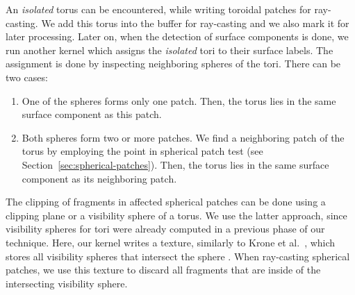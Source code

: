 An \textit{isolated} torus can be encountered, while writing toroidal patches for ray-casting.
We add this torus into the buffer for ray-casting and we also mark it for later processing.
Later on, when the detection of surface components is done, we run another kernel which assigns the \textit{isolated} tori to their surface labels.
The assignment is done by inspecting neighboring spheres of the tori.
There can be two cases:
\begin{enumerate}
  \item One of the spheres forms only one patch. Then, the torus lies in the same surface component as this patch.
	\item Both spheres form two or more patches. We find a neighboring patch of the torus by employing the point in spherical patch test (see Section~\ref{sec:spherical-patches}). Then, the torus lies in the same surface component as its neighboring patch.
\end{enumerate}

The clipping of fragments in affected spherical patches can be done using a clipping plane or a visibility sphere of a torus.
We use the latter approach, since visibility spheres for tori were already computed in a previous phase of our technique.
Here, our kernel writes a texture, similarly to Krone et al.~\cite{krone2011parallel}, which stores all visibility spheres that intersect the sphere .
When ray-casting spherical patches, we use this texture to discard all fragments that are inside of the intersecting visibility sphere.
